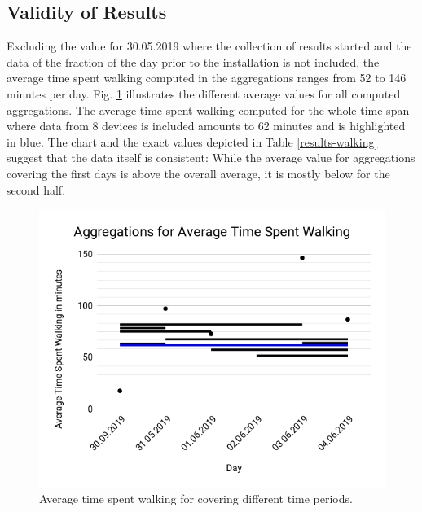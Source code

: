 \subsection{Validity of Results}
Excluding the value for 30.05.2019 where the collection of results started and the data of the fraction of the day prior to the installation is not included, the average time spent walking computed in the aggregations ranges from 52 to 146 minutes per day. Fig. \ref{time-walking-diagram} illustrates the different average values for all computed aggregations. The average time spent walking computed for the whole time span where data from 8 devices is included amounts to 62 minutes and is highlighted in blue. The chart and the exact values depicted in Table \ref{results-walking} suggest that the data itself is consistent: While the average value for aggregations covering the first days is above the overall average, it is mostly below for the second half.

\begin{figure}[h!]
	\includegraphics[width=\textwidth]{data/diagrams/average-time-walking2.png}
	\caption{Average time spent walking for covering different time periods.}
	\label{time-walking-diagram}
\end{figure}

